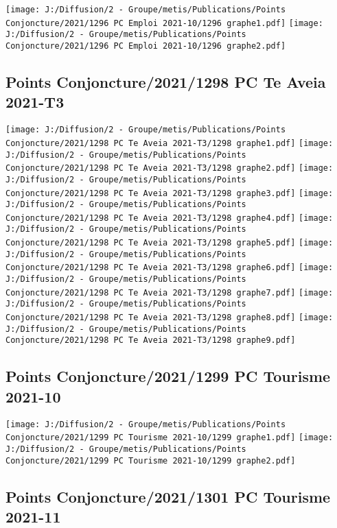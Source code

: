 \documentclass[
]{article}
\begin{document}
\texttt{[image: J:/Diffusion/2 - Groupe/metis/Publications/Points Conjoncture/2021/1296 PC Emploi 2021-10/1296 graphe1.pdf]}
\texttt{[image: J:/Diffusion/2 - Groupe/metis/Publications/Points Conjoncture/2021/1296 PC Emploi 2021-10/1296 graphe2.pdf]}

\hypertarget{points-conjoncture20211298-pc-te-aveia-2021-t3}{%
\subsection{Points Conjoncture/2021/1298 PC Te Aveia
2021-T3}\label{points-conjoncture20211298-pc-te-aveia-2021-t3}}

\texttt{[image: J:/Diffusion/2 - Groupe/metis/Publications/Points Conjoncture/2021/1298 PC Te Aveia 2021-T3/1298 graphe1.pdf]}
\texttt{[image: J:/Diffusion/2 - Groupe/metis/Publications/Points Conjoncture/2021/1298 PC Te Aveia 2021-T3/1298 graphe2.pdf]}
\texttt{[image: J:/Diffusion/2 - Groupe/metis/Publications/Points Conjoncture/2021/1298 PC Te Aveia 2021-T3/1298 graphe3.pdf]}
\texttt{[image: J:/Diffusion/2 - Groupe/metis/Publications/Points Conjoncture/2021/1298 PC Te Aveia 2021-T3/1298 graphe4.pdf]}
\texttt{[image: J:/Diffusion/2 - Groupe/metis/Publications/Points Conjoncture/2021/1298 PC Te Aveia 2021-T3/1298 graphe5.pdf]}
\texttt{[image: J:/Diffusion/2 - Groupe/metis/Publications/Points Conjoncture/2021/1298 PC Te Aveia 2021-T3/1298 graphe6.pdf]}
\texttt{[image: J:/Diffusion/2 - Groupe/metis/Publications/Points Conjoncture/2021/1298 PC Te Aveia 2021-T3/1298 graphe7.pdf]}
\texttt{[image: J:/Diffusion/2 - Groupe/metis/Publications/Points Conjoncture/2021/1298 PC Te Aveia 2021-T3/1298 graphe8.pdf]}
\texttt{[image: J:/Diffusion/2 - Groupe/metis/Publications/Points Conjoncture/2021/1298 PC Te Aveia 2021-T3/1298 graphe9.pdf]}

\hypertarget{points-conjoncture20211299-pc-tourisme-2021-10}{%
\subsection{Points Conjoncture/2021/1299 PC Tourisme
2021-10}\label{points-conjoncture20211299-pc-tourisme-2021-10}}

\texttt{[image: J:/Diffusion/2 - Groupe/metis/Publications/Points Conjoncture/2021/1299 PC Tourisme 2021-10/1299 graphe1.pdf]}
\texttt{[image: J:/Diffusion/2 - Groupe/metis/Publications/Points Conjoncture/2021/1299 PC Tourisme 2021-10/1299 graphe2.pdf]}

\hypertarget{points-conjoncture20211301-pc-tourisme-2021-11}{%
\subsection{Points Conjoncture/2021/1301 PC Tourisme
2021-11}\label{points-conjoncture20211301-pc-tourisme-2021-11}}
\end{document}

